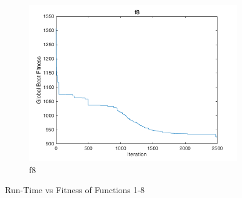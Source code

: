 \begin{figure}
\begin{subfigure}[b]{0.4\textwidth}
    \includegraphics[width=\textwidth]{img/cecrt/f8}
    \caption{f8}
  \end{subfigure}
  \caption{Run-Time vs Fitness of Functions 1-8}
\end{figure}

\clearpage

